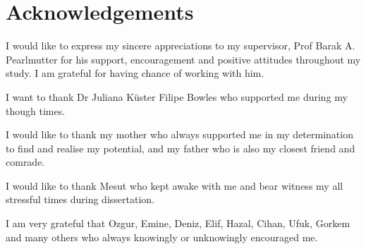 \section*{Acknowledgements}
I would like to express my sincere appreciations to my supervisor, Prof Barak A. Pearlmutter for his support, encouragement and positive attitudes throughout my study. I am grateful for having chance of working with him.

I want to thank Dr Juliana Küster Filipe Bowles who supported me during my though times. 

I would like to thank my mother who always supported me in my determination to find and realise my potential, and my father who is also my closest friend and comrade.

I would like to thank Mesut who kept awake with me and bear witness my all stressful times during dissertation.

I am very grateful that Ozgur, Emine, Deniz, Elif, Hazal, Cihan, Ufuk, Gorkem and many others who always knowingly or unknowingly encouraged me.